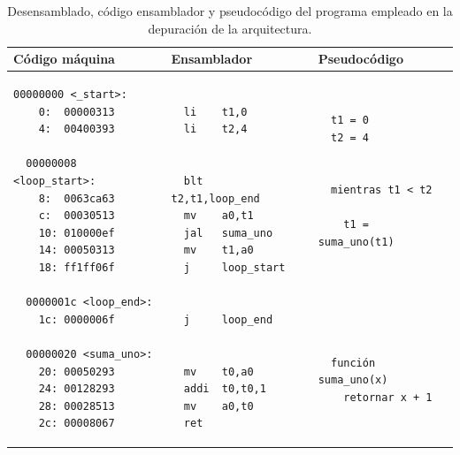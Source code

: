\begin{table}[h!]
\centering
\renewcommand{\arraystretch}{1.2}

\begin{tabular}{|p{}|p{}|p{}|}
\hline

\textbf{Código máquina} &
\textbf{Ensamblador} &
\textbf{Pseudocódigo} \\
\hline

\begin{lstlisting}[style=RiscVStyle]
  00000000 <_start>:
    0:  00000313
    4:  00400393

  00000008 <loop_start>:
    8:  0063ca63
    c:  00030513
    10: 010000ef
    14: 00050313
    18: ff1ff06f

  0000001c <loop_end>:
    1c: 0000006f
    
  00000020 <suma_uno>:
    20: 00050293
    24: 00128293
    28: 00028513
    2c: 00008067
\end{lstlisting}

&

\begin{lstlisting}[style=RiscVStyle]
  
  li    t1,0
  li    t2,4


  blt   t2,t1,loop_end
  mv    a0,t1
  jal   suma_uno
  mv    t1,a0
  j     loop_start


  j     loop_end


  mv    t0,a0
  addi  t0,t0,1
  mv    a0,t0
  ret
\end{lstlisting}

&

\begin{lstlisting}[style=RiscVStyle]
  
  t1 = 0
  t2 = 4
  
  
  mientras t1 < t2
  
    t1 = suma_uno(t1)
  



  
  
  función suma_uno(x)
    retornar x + 1
  
\end{lstlisting}

\\
\hline
\end{tabular}

\caption{Desensamblado, código ensamblador y pseudocódigo del programa empleado en la depuración de la arquitectura.}
\end{table}


